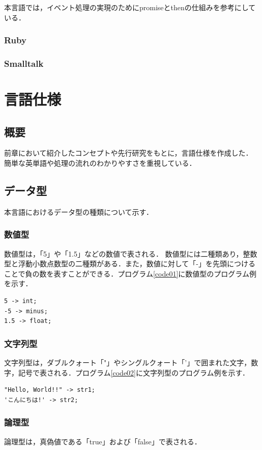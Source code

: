 \documentclass[10pt,a4j]{ltjsarticle}
\begin{document}
本言語では，イベント処理の実現のためにpromiseとthenの仕組みを参考にしている．

\subsubsection{Ruby}
\subsubsection{Smalltalk}
\clearpage

\section{言語仕様}
\subsection{概要}
前章において紹介したコンセプトや先行研究\cite{senkou1,senkou2}をもとに，言語仕様を作成した．
簡単な英単語や処理の流れのわかりやすさを重視している．
\subsection{データ型}
本言語におけるデータ型の種類について示す．
\subsubsection{数値型}
数値型は，「5」や「1.5」などの数値で表される．
数値型には二種類あり，整数型と浮動小数点数型の二種類がある．また，数値に対して「-」を先頭につけることで負の数を表すことができる．プログラム\ref{code01}に数値型のプログラム例を示す．

\begin{lstlisting}[caption=数値型のプログラム例, label=code01]
5 -> int;
-5 -> minus;
1.5 -> float;
\end{lstlisting}

\subsubsection{文字列型}
文字列型は，ダブルクォート「"」やシングルクォート「'」で囲まれた文字，数字，記号で表される．プログラム\ref{code02}に文字列型のプログラム例を示す．

\begin{lstlisting}[caption=文字列型のプログラム例, label=code02]
"Hello, World!!" -> str1;
'こんにちは!' -> str2;
\end{lstlisting}

\subsubsection{論理型}
論理型は，真偽値である「true」および「false」で表される．
\end{document}
